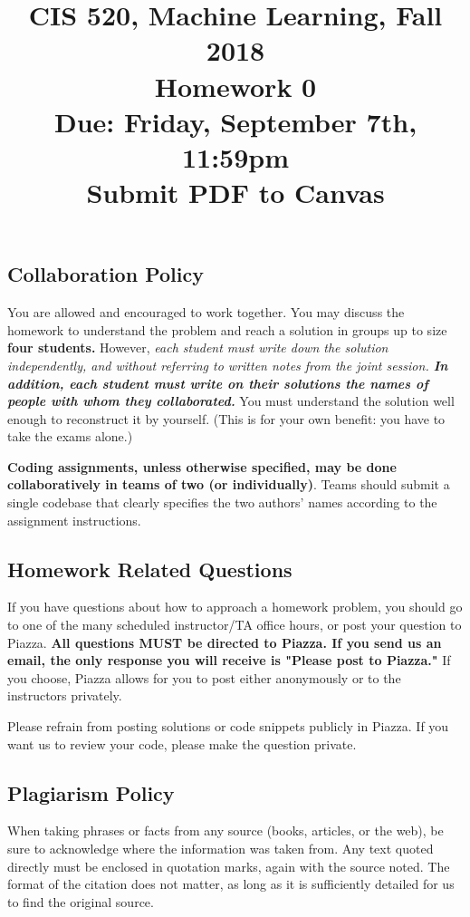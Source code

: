 \documentclass[english]{article}
\title{CIS 520, Machine Learning, Fall 2018 \\ Homework 0\\
Due: Friday, September 7th, 11:59pm \\ Submit PDF to Canvas}
\date{}
\begin{document}
\maketitle
\vspace{-30pt}
\subsection*{Collaboration Policy} 

You are allowed and encouraged to work together. You may discuss the
homework to understand the problem and reach a solution in groups up
to size {\bf four students.} However, {\em each student must write
  down the solution independently, and without referring to written
  notes from the joint session. {\bf In addition, each student must
    write on their solutions the names of people with whom they
    collaborated.}} You must understand the solution well enough 
to reconstruct it by yourself. (This is for your own benefit:
you have to take the exams alone.)

{\bf Coding assignments, unless otherwise specified, may be done
  collaboratively in teams of two (or individually)}. Teams should
submit a single codebase that clearly specifies the two
authors' names according to the assignment instructions.

\subsection*{Homework Related Questions}
If you have questions about how to approach a homework problem, you
should go to one of the many scheduled instructor/TA office hours, or post your question to Piazza. 
{\bf All questions MUST be directed to Piazza. If you send us an email, the only response you will receive is "Please post to Piazza." } If you choose, Piazza allows for you to post either anonymously or to the instructors privately.

Please refrain from posting solutions or code snippets publicly in Piazza. If you want us to review your code, please make the question private.

\subsection*{Plagiarism Policy}
When taking phrases or facts from any source (books,
articles, or the web), be sure to acknowledge where the information
was taken from.  Any text quoted directly must be enclosed in
quotation marks, again with the source noted.  The format of the
citation does not matter, as long as it is sufficiently detailed for
us to find the original source.
\end{document}
